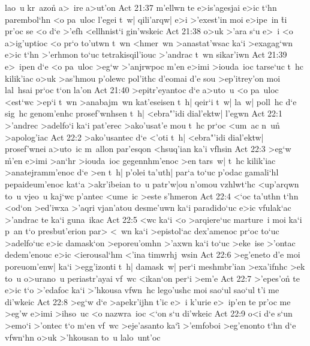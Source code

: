 lao~u
kr~azo\r{n}
a>~ire
a>ut'on\bibvsend
\vs Act 21:37
m'ellwn
te
e>is'agesjai
e>ic
t`hn
parembol`hn
<o
pa~uloc
l'egei
t~w|
qili'arqw|
e>i
>'exest'in
moi
e>ipe~in
\r{t}i
pr'oc
se
<o
d`e
>'efh
<ellhnist`i
gin'wskeic\bibvsend
\vs Act 21:38
o>uk
>'ara
s`u
e>~i
<o
a>ig'uptioc
<o
pr`o
to'utwn
t~wn
<hmer~wn
>anastat'wsac
ka`i
>exagag`wn
e>ic
t`hn
>'erhmon
to`uc
tetrakisqil'iouc
>'andrac
t~wn
sikar'iwn\bibvsend
\vs Act 21:39
e>~ipen
d`e
<o
pa~uloc
>eg`w
>'anjrwpoc
m'en
e>imi
>iouda~ioc
tarse`uc
t~hc
kilik'iac
o>uk
>as'hmou
p'olewc
pol'ithc
d'eomai
d'e
sou
>ep'itrey'on
moi
lal~hsai
pr`oc
t`on
la'on\bibvsend
\vs Act 21:40
>epitr'eyantoc
d`e
a>uto~u
<o
pa~uloc
<est`wc
>ep`i
t~wn
>anabajm~wn
kat'eseisen
t~h|
qeir`i
t~w|
la~w|
poll~hc
d`e
sig~hc
genom'enhc
prosef'wnhsen
t~h|
<ebra"'idi
dial'ektw|
l'egwn\bibvsend
\vs Act 22:1
>'andrec
>adelfo`i
ka`i
pat'erec
>ako'usat'e
mou
t~hc
pr`oc
<um~ac
n~u\r{n}
>apolog'iac\bibvsend
\vs Act 22:2
>ako'usantec
d`e
<'oti
t~h|
<ebra"'idi
dial'ektw|
prosef'wnei
a>uto~ic
m~allon
par'esqon
<hsuq'ian
ka'i
vfhsin\bibvsend
\vs Act 22:3
>eg`w
\r{m}'en
e>imi
>an`hr
>iouda~ioc
gegennhm'enoc
>en
tars~w|
t~hc
kilik'iac
>anatejramm'enoc
d`e
>en
t~h|
p'olei
ta'uth|
par`a
to`uc
p'odac
gamali`hl
pepaideum'enoc
kat`a
>akr'ibeian
to~u
patr'w|ou
n'omou
vzhlwt`hc
<up'arqwn
to~u
vjeo~u
kaj`wc
p'antec
<ume~ic
>este
s'hmeron\bibvsend
\vs Act 22:4
<`oc
ta'uthn
t`hn
<od`on
>ed'iwxa
>'aqri
vjan'atou
desme'uwn
ka`i
paradido`uc
e>ic
vfulak`ac
>'andrac
te
ka`i
guna~ikac\bibvsend
\vs Act 22:5
<wc
ka`i
<o
>arqiere`uc
marture~i
moi
ka`i
p~an
t`o
presbut'erion
par>
<~wn
ka`i
>epistol`ac
dex'amenoc
pr`oc
to`uc
>adelfo`uc
e>ic
damask`on
>eporeu'omhn
>'axwn
ka`i
to`uc
>eke~ise
>'ontac
dedem'enouc
e>ic
<ierousal`hm
<'ina
timwrhj~wsin\bibvsend
\vs Act 22:6
>eg'eneto
d'e
moi
poreuom'enw|
ka`i
>egg'izonti
t~h|
damask~w|
per`i
meshmbr'ian
>exa'ifnhc
>ek
to~u
o>urano~u
periastr'ayai
vf~wc
<ikan`on
per`i
>em'e\bibvsend
\vs Act 22:7
>'epes'o\r{n}
te
e>ic
t`o
>'edafoc
ka`i
>'hkousa
vfwn~hc
lego'ushc
moi
sao`ul
sao`ul
t'i
me
di'wkeic\bibvsend
\vs Act 22:8
>eg`w
d`e
>apekr'ijhn
t'ic
e>~i
k'urie
e>~ip'en
te
pr'oc
me
>eg'w
e>imi
>ihso~uc
<o
nazwra~ioc
<`on
s`u
di'wkeic\bibvsend
\vs Act 22:9
o<i
d`e
s`un
>emo`i
>'ontec
t`o
m`en
vf~wc
>eje'asanto
ka`i\r{}
>'emfoboi
>eg'enonto
t`hn
d`e
vfwn`hn
o>uk
>'hkousan
to~u
lalo~unt'oc
